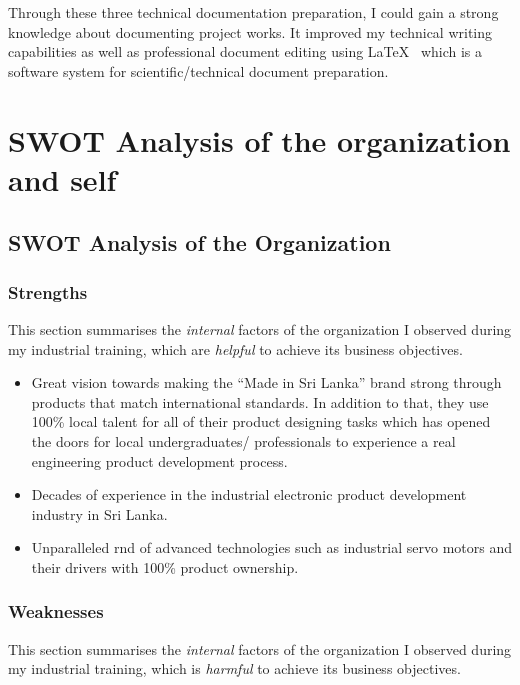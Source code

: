 \documentclass[a4paper,12pt]{report}
\begin{document}
Through these three technical documentation preparation, I could gain a strong knowledge about documenting project works. It improved my technical writing capabilities as well as professional document editing using \LaTeX ~ which is a software system for scientific/technical document preparation.



\chapter{SWOT Analysis of the organization and self}

\section{SWOT Analysis of the Organization}


\subsection{Strengths}

This section summarises the \textit{internal} factors of the organization I observed during my industrial training, which are \textit{helpful} to achieve its business objectives.

\begin{itemize}
	\item Great vision towards making the ``Made in Sri Lanka'' brand strong through products that match international standards. In addition to that, they use 100\% local talent for all of their product designing tasks which has opened the doors for local undergraduates/ professionals to experience a real engineering product development process.
	
	\item Decades of experience in the industrial electronic product development industry in Sri Lanka.
	\item Unparalleled \ac{rnd} of advanced technologies such as industrial servo motors and their drivers with 100\% product ownership.
\end{itemize}


\subsection{Weaknesses}

This section summarises the \textit{internal} factors of the organization I observed during my industrial training, which is \textit{harmful} to achieve its business objectives.
\end{document}
